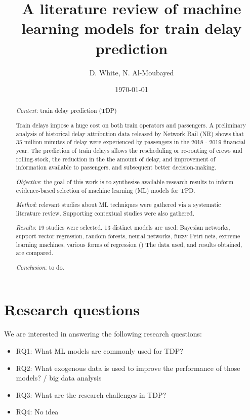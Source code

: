 \documentclass{article}
\title{A literature review of machine learning models for train delay prediction}
\author{D. White, N. Al-Moubayed}
\date{\today}
\begin{document}
\begin{titlingpage}

\maketitle
\begin{abstract}

\textit{Context}: train delay prediction (TDP) 

Train delays impose a huge cost on both train operators and passengers. A preliminary analysis of historical delay attribution data released by Network Rail (NR) shows that
35 million minutes of delay were experienced by passengers in the 2018 - 2019 financial year. The prediction of train delays allows the rescheduling or re-routing of crews and rolling-stock,
the reduction in the the amount of delay, and improvement of information available to passengers, and subsequent better decision-making. 

\textit{Objective}: the goal of this work is to synthesise available research results to inform evidence-based selection of machine learning (ML) models for TPD.

\textit{Method}: relevant studies about ML techniques were gathered via a systematic literature review. Supporting contextual studies were also gathered.

\textit{Results}: 19 studies were selected. 13 distinct models are used: Bayesian networks, support vector regression, random forests, neural networks, fuzzy Petri nets, extreme learning machines, various forms of regression () 
The data used, and results obtained, are compared. 

\textit{Conclusion}: to do.

\end{abstract}
\end{titlingpage}

\tableofcontents
 
\clearpage

\twocolumn


\section{Research questions}

We are interested in answering the following research questions:

\begin{itemize}
	\item RQ1: What ML models are commonly used for TDP?
	\item RQ2: What exogenous data is used to improve the performance of those models? / big data analysis
	\item RQ3: What are the research challenges in TDP?
	\item RQ4: No idea
\end{itemize}
\end{document}
